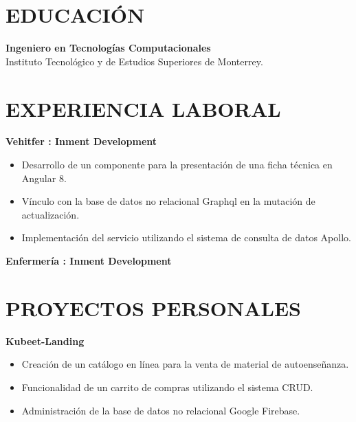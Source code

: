 \documentclass{res}
\begin{document}
\address{
}

\begin{resume}
    \vspace{-4mm}
    \separator

    \section{\large{EDUCACIÓN}} 
    \textbf{Ingeniero en Tecnologías Computacionales} 
     \\
    Instituto Tecnológico y de Estudios Superiores de Monterrey.
    
    \section{\large{EXPERIENCIA LABORAL}} 
    \textbf{Vehitfer : Inment Development} 
    \begin{itemize}
        \item Desarrollo de un componente para la presentación de una ficha técnica en Angular 8.
        \item Vínculo con la base de datos no relacional Graphql en la mutación de actualización.
        \item Implementación del servicio utilizando el sistema de consulta de datos Apollo.
    \end{itemize}

    \textbf{Enfermería : Inment Development} 

    \section{\large{PROYECTOS PERSONALES}} 
    \textbf{Kubeet-Landing} 
    \begin{itemize}
        \item Creación de un catálogo en línea para la venta de material de autoenseñanza.
        \item Funcionalidad de un carrito de compras utilizando el sistema CRUD.
        \item Administración de la base de datos no relacional Google Firebase.
    \end{itemize}


\end{resume}
\end{document}
